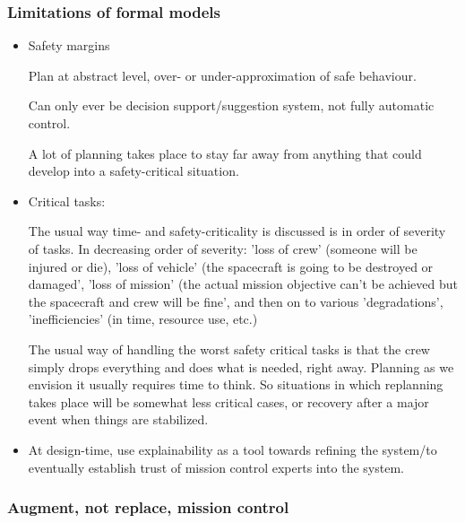 \subsubsection{Limitations of formal models}

\begin{itemize}
\item Safety margins

    Plan at abstract level, over- or under-approximation of safe behaviour.
    
    Can only ever be decision support/suggestion system, not fully automatic control.
    
    A lot of planning takes place to stay far away from anything that could develop into a safety-critical situation.
    
\item Critical tasks: 

    The usual way time- and safety-criticality is discussed is in order of severity of tasks.  In decreasing order of severity: 'loss of crew' (someone will be injured or die), 'loss of vehicle' (the spacecraft is going to be destroyed or damaged', 'loss of mission' (the actual mission objective can't be achieved but the spacecraft and crew will be fine', and then on to various 'degradations', 'inefficiencies' (in time, resource use, etc.)
    
    The usual way of handling the worst safety critical tasks is that the crew simply drops everything and does what is needed, right away.  Planning as we envision it usually requires time to think.  So situations in which replanning takes place will be somewhat less critical cases, or recovery after a major event when things are stabilized.

\item At design-time, use explainability as a tool towards refining the system/to eventually establish trust of mission control experts into the system.


\end{itemize}


\subsubsection{Augment, not replace, mission control}


